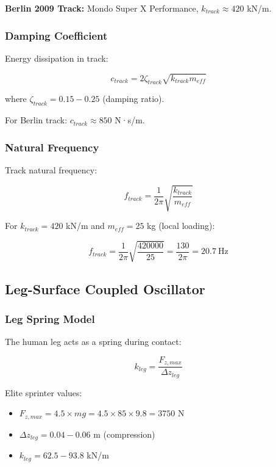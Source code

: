 \textbf{Berlin 2009 Track:} Mondo Super X Performance, $k_{track} \approx 420$ kN/m.

\subsubsection{Damping Coefficient}

Energy dissipation in track:

\begin{equation}
c_{track} = 2\zeta_{track} \sqrt{k_{track} m_{eff}}
\label{eq:track_damping}
\end{equation}

where $\zeta_{track} = 0.15-0.25$ (damping ratio).

For Berlin track: $c_{track} \approx 850$ N·s/m.

\subsubsection{Natural Frequency}

Track natural frequency:

\begin{equation}
f_{track} = \frac{1}{2\pi} \sqrt{\frac{k_{track}}{m_{eff}}}
\label{eq:track_natural_frequency}
\end{equation}

For $k_{track} = 420$ kN/m and $m_{eff} = 25$ kg (local loading):

\begin{equation}
f_{track} = \frac{1}{2\pi} \sqrt{\frac{420000}{25}} = \frac{130}{2\pi} = 20.7~\text{Hz}
\label{eq:berlin_track_frequency}
\end{equation}

\subsection{Leg-Surface Coupled Oscillator}

\subsubsection{Leg Spring Model}

The human leg acts as a spring during contact:

\begin{equation}
k_{leg} = \frac{F_{z,max}}{\Delta z_{leg}}
\label{eq:leg_stiffness}
\end{equation}

Elite sprinter values:
\begin{itemize}
\item $F_{z,max} = 4.5 \times mg = 4.5 \times 85 \times 9.8 = 3750$ N
\item $\Delta z_{leg} = 0.04-0.06$ m (compression)
\item $k_{leg} = 62.5-93.8$ kN/m
\end{itemize}

